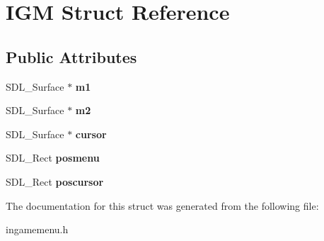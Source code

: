 \hypertarget{structIGM}{}\section{I\+GM Struct Reference}
\label{structIGM}
\subsection*{Public Attributes}
\begin{DoxyCompactItemize}
\item 
S\+D\+L\+\_\+\+Surface $\ast$ {\bfseries m1}\hypertarget{structIGM_a43c7fa7ce1f4221d6a91aa78cc098362}{}\label{structIGM_a43c7fa7ce1f4221d6a91aa78cc098362}

\item 
S\+D\+L\+\_\+\+Surface $\ast$ {\bfseries m2}\hypertarget{structIGM_af9f176426c22a3196de5aec1732918df}{}\label{structIGM_af9f176426c22a3196de5aec1732918df}

\item 
S\+D\+L\+\_\+\+Surface $\ast$ {\bfseries cursor}\hypertarget{structIGM_a6640d7a9b8f4cfd2c30e3444bac6869f}{}\label{structIGM_a6640d7a9b8f4cfd2c30e3444bac6869f}

\item 
S\+D\+L\+\_\+\+Rect {\bfseries posmenu}\hypertarget{structIGM_a798977bd5a3b1672d1e4e871bffe5862}{}\label{structIGM_a798977bd5a3b1672d1e4e871bffe5862}

\item 
S\+D\+L\+\_\+\+Rect {\bfseries poscursor}\hypertarget{structIGM_a265181e69e2026147d12b32b293d56bf}{}\label{structIGM_a265181e69e2026147d12b32b293d56bf}

\end{DoxyCompactItemize}


The documentation for this struct was generated from the following file\+:\begin{DoxyCompactItemize}
\item 
ingamemenu.\+h\end{DoxyCompactItemize}
